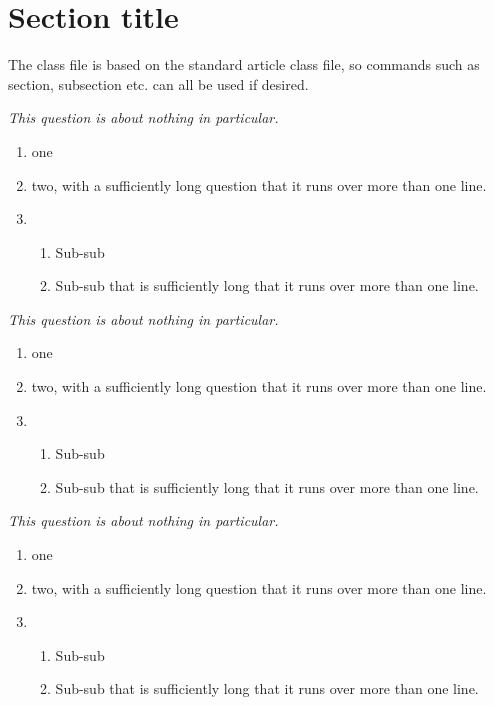 \documentclass{ouexam}
\begin{document}
\section{Section title}

The class file is based on the standard article class file, so commands such as section, subsection etc. can all be used if desired.



\question
\emph{This question is about nothing in particular.}
\begin{enumerate}
\item one
\item two, with a sufficiently long question that it runs over more than one line.
\item 
\begin{enumerate}
\item Sub-sub
\item Sub-sub that is sufficiently long that it runs over more than one line.
\end{enumerate}
\end{enumerate}



\question
\emph{This question is about nothing in particular.}
\begin{enumerate}
\item one
\item two, with a sufficiently long question that it runs over more than one line.
\item 
\begin{enumerate}
\item Sub-sub
\item Sub-sub that is sufficiently long that it runs over more than one line.
\end{enumerate}
\end{enumerate}



\question
\emph{This question is about nothing in particular.}
\begin{enumerate}
\item one
\item two, with a sufficiently long question that it runs over more than one line.
\item 
\begin{enumerate}
\item Sub-sub
\item Sub-sub that is sufficiently long that it runs over more than one line.
\end{enumerate}
\end{enumerate}
\end{document}

